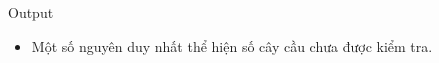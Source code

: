 Output
\begin{itemize}
	\item     Một số nguyên duy nhất thể hiện số cây cầu chưa được kiểm tra.   
\end{itemize}